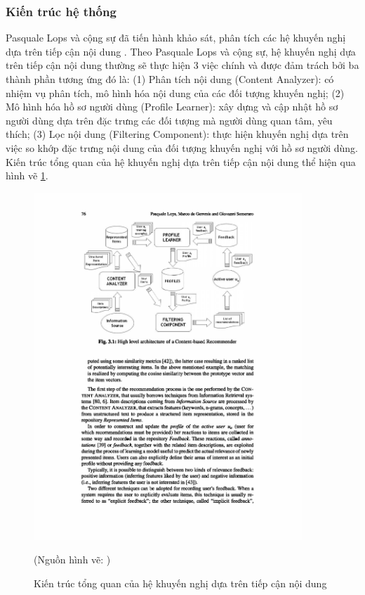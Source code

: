 \subsubsection{Kiến trúc hệ thống}
Pasquale Lops và cộng sự đã tiến hành khảo sát, phân tích các hệ khuyến nghị dựa trên tiếp cận nội dung \cite{Lops2011CBRecSys}. Theo Pasquale Lops và cộng sự, hệ khuyến nghị dựa trên tiếp cận nội dung thường sẽ thực hiện 3 việc chính và được đảm trách bởi ba thành phần tương ứng đó là: (1) Phân tích nội dung (Content Analyzer): có nhiệm vụ phân tích, mô hình hóa nội dung của các đối tượng khuyến nghị; (2) Mô hình hóa hồ sơ người dùng (Profile Learner): xây dựng và cập nhật hồ sơ người dùng dựa trên đặc trưng các đối tượng mà người dùng quan tâm, yêu thích; (3) Lọc nội dung (Filtering Component): thực hiện khuyến nghị dựa trên việc so khớp đặc trưng nội dung của đối tượng khuyến nghị với hồ sơ người dùng. Kiến trúc tổng quan của hệ khuyến nghị dựa trên tiếp cận nội dung thể hiện qua hình vẽ \ref{fig:figure_1_11}.
\begin{figure}[ht]
	\begin{center}
		\includegraphics[width=0.9\textwidth]{Figure_1_11.pdf}
		\caption{Kiến trúc tổng quan của hệ khuyến nghị dựa trên tiếp cận nội dung}\label{fig:figure_1_11}
		(Nguồn hình vẽ: \cite{Lops2011CBRecSys})
	\end{center}
\end{figure}
